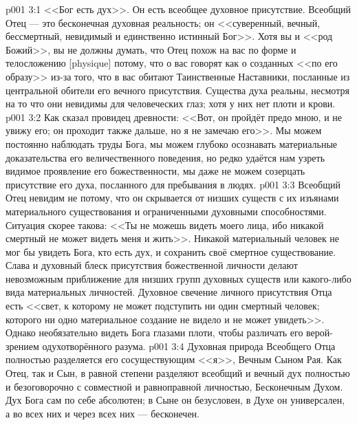 \vs p001 3:1 <<Бог есть дух>>. Он есть всеобщее духовное присутствие. Всеобщий Отец --- это бесконечная духовная реальность; он <<суверенный, вечный, бессмертный, невидимый и единственно истинный Бог>>. Хотя вы и <<род Божий>>, вы не должны думать, что Отец похож на вас по форме и телосложению [physique] потому, что о вас говорят как о созданных <<по его образу>> из\hyp{}за того, что в вас обитают Таинственные Наставники, посланные из центральной обители его вечного присутствия. Существа духа реальны, несмотря на то что они невидимы для человеческих глаз; хотя у них нет плоти и крови.
\vs p001 3:2 Как сказал провидец древности: <<Вот, он пройдёт предо мною, и не увижу его; он проходит также дальше, но я не замечаю его>>. Мы можем постоянно наблюдать труды Бога, мы можем глубоко осознавать материальные доказательства его величественного поведения, но редко удаётся нам узреть видимое проявление его божественности, мы даже не можем созерцать присутствие его духа, посланного для пребывания в людях.
\vs p001 3:3 Всеобщий Отец невидим не потому, что он скрывается от низших существ с их изъянами материального существования и ограниченными духовными способностями. Ситуация скорее такова: <<Ты не можешь видеть моего лица, ибо никакой смертный не может видеть меня и жить>>. Никакой материальный человек не мог бы увидеть Бога, кто есть дух, и сохранить своё смертное существование. Слава и духовный блеск присутствия божественной личности делают невозможным приближение для низших групп духовных существ или какого\hyp{}либо вида материальных личностей. Духовное свечение личного присутствия Отца есть <<свет, к которому не может подступить ни один смертный человек; которого ни одно материальное создание не видело и не может увидеть>>. Однако необязательно видеть Бога глазами плоти, чтобы различать его верой\hyp{}зрением одухотворённого разума.
\vs p001 3:4 \pc Духовная природа Всеобщего Отца полностью разделяется его сосуществующим <<я>>, Вечным Сыном Рая. Как Отец, так и Сын, в равной степени разделяют всеобщий и вечный дух полностью и безоговорочно с совместной и равноправной личностью, Бесконечным Духом. Дух Бога сам по себе абсолютен; в Сыне он безусловен, в Духе он универсален, а во всех них и через всех них --- бесконечен.
